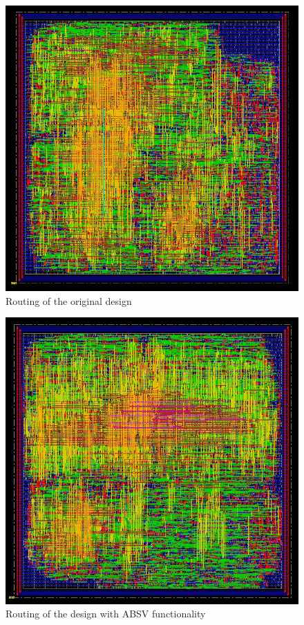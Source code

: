 \begin{figure}[h!]
	\centering
	\includegraphics[width=18cm]{./images/original_route}
	\caption{Routing of the original design}
	\label{fig5.6}
\end{figure}
\begin{figure}[h!]
	\centering
	\includegraphics[width=18cm]{./images/ABSV_route}
	\caption{Routing of the design with ABSV functionality}
	\label{fig5.6}
\end{figure}